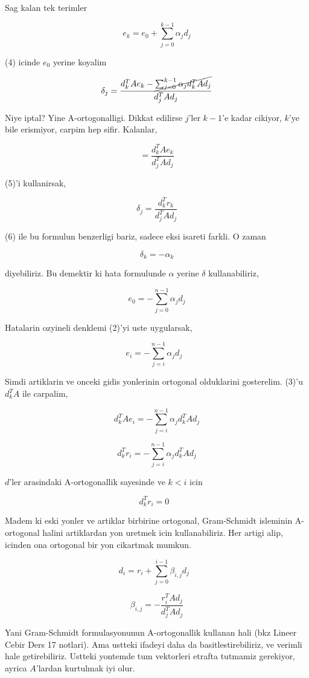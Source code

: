 \documentclass[12pt,fleqn]{article}\usepackage{../common}
\begin{document}
Sag kalan tek terimler 

\[ e_k = e_0 + \sum _{ j=0}^{k-1} \alpha_j d_j \]

(4) icinde $e_0$ yerine koyalim

\[ \delta_j = \frac{ d_k^T A e_k - \cancel{\sum _{ j=0}^{k-1} \alpha_j d_k^T A d_j}}
{ d_j^T A d_j } 
\]

Niye iptal? Yine A-ortogonalligi. Dikkat edilirse $j$'ler $k-1$'e kadar
cikiyor, $k$'ye bile erismiyor, carpim hep sifir. Kalanlar,

\[  = \frac{ d_k^T A e_k}
{ d_j^T A d_j } 
\]

(5)'i kullanirsak, 

\[ \delta_j = \frac{ d_k^T r_k}
{ d_j^T A d_j } 
\]


(6) ile bu formulun benzerligi bariz, sadece eksi isareti farkli. O zaman 

\[ \delta_k = -\alpha_k \]

diyebiliriz. Bu demektir ki hata formulunde $\alpha$ yerine $\delta$
kullanabiliriz, 

\[ e_0 = -\sum _{ j=0}^{n-1} \alpha_j d_j \]

Hatalarin ozyineli denklemi (2)'yi uste uygularsak, 

\[ e_i = -\sum _{ j=i}^{n-1} \alpha_j d_j 
\ \ \ \label{3}
\]

Simdi artiklarin ve onceki gidis yonlerinin ortogonal olduklarini
gosterelim. (3)'u $d_k^TA$ ile carpalim, 

\[ d_k^TAe_i = -\sum _{ j=i}^{n-1} \alpha_j  d_k^TAd_j 
\]

\[ d_k^Tr_i = -\sum _{ j=i}^{n-1} \alpha_j  d_k^TAd_j 
\]

$d$'ler arasindaki A-ortogonallik sayesinde ve $k < i$ icin 

\[ d_k^Tr_i = 0
\ \ \ \label{9}
\]

Madem ki eski yonler ve artiklar birbirine ortogonal, Gram-Schmidt
isleminin A-ortogonal halini artiklardan yon uretmek icin
kullanabiliriz. Her artigi alip, icinden ona ortogonal bir yon cikartmak
mumkun.

\[ d_i = r_i + \sum _{ j=0}^{i-1} \beta_{i,j}d_j 
\ \ \ \label{10}
\]

\[ \beta_{i,j} = - \frac{ r_i^TAd_j}{d_j^TAd_j} \]

Yani Gram-Schmidt formulasyonunun A-ortogonallik kullanan hali (bkz Lineer
Cebir Ders 17 notlari). Ama ustteki ifadeyi daha da basitlestirebiliriz, ve
verimli hale getirebiliriz. Ustteki yontemde tum vektorleri etrafta
tutmamiz gerekiyor, ayrica $A$'lardan kurtulmak iyi olur. 
\end{document}
